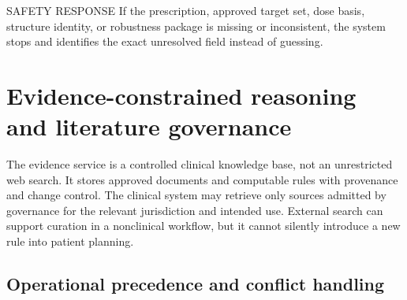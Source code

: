 \documentclass[11pt,letterpaper]{article}
\begin{document}
\begin{nlnotice}{SAFETY RESPONSE}
If the prescription, approved target set, dose basis, structure identity, or robustness package is missing or inconsistent, the system stops and identifies the exact unresolved field instead of guessing.
\end{nlnotice}

\section{Evidence-constrained reasoning and literature governance}

The evidence service is a controlled clinical knowledge base, not an unrestricted web search. It stores approved documents and computable rules with provenance and change control. The clinical system may retrieve only sources admitted by governance for the relevant jurisdiction and intended use. External search can support curation in a nonclinical workflow, but it cannot silently introduce a new rule into patient planning.

\subsection{Operational precedence and conflict handling}
\end{document}
